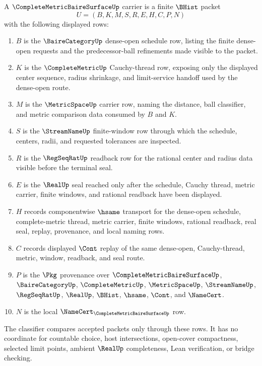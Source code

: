 \begin{definition}
\label{def:complete-metric-baire-surface-carrier}
A $\CompleteMetricBaireSurfaceUp$ carrier is a finite $\BHist$ packet
$$
U=(B,K,M,S,R,E,H,C,P,N)
$$
with the following displayed rows:
\begin{enumerate}
\item $B$ is the $\BaireCategoryUp$ dense-open schedule row, listing the finite dense-open requests and the predecessor-ball refinements made visible to the packet.
\item $K$ is the $\CompleteMetricUp$ Cauchy-thread row, exposing only the displayed center sequence, radius shrinkage, and limit-service handoff used by the dense-open route.
\item $M$ is the $\MetricSpaceUp$ carrier row, naming the distance, ball classifier, and metric comparison data consumed by $B$ and $K$.
\item $S$ is the $\StreamNameUp$ finite-window row through which the schedule, centers, radii, and requested tolerances are inspected.
\item $R$ is the $\RegSeqRatUp$ readback row for the rational center and radius data visible before the terminal seal.
\item $E$ is the $\RealUp$ seal reached only after the schedule, Cauchy thread, metric carrier, finite windows, and rational readback have been displayed.
\item $H$ records componentwise $\hsame$ transport for the dense-open schedule, complete-metric thread, metric carrier, finite windows, rational readback, real seal, replay, provenance, and local naming rows.
\item $C$ records displayed $\Cont$ replay of the same dense-open, Cauchy-thread, metric, window, readback, and seal route.
\item $P$ is the $\Pkg$ provenance over $\CompleteMetricBaireSurfaceUp$, $\BaireCategoryUp$, $\CompleteMetricUp$, $\MetricSpaceUp$, $\StreamNameUp$, $\RegSeqRatUp$, $\RealUp$, $\BHist$, $\hsame$, $\Cont$, and $\NameCert$.
\item $N$ is the local $\NameCert_{\CompleteMetricBaireSurfaceUp}$ row.
\end{enumerate}
The classifier compares accepted packets only through these rows. It has no coordinate for countable choice, host intersections, open-cover compactness, selected limit points, ambient $\RealUp$ completeness, Lean verification, or bridge checking.
\end{definition}

